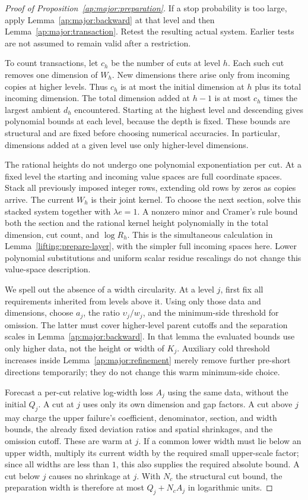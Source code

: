 \begin{proof}[Proof of Proposition~\ref{ap:major:preparation}]
If a stop probability is too large, apply
Lemma~\ref{ap:major:backward} at that level and then
Lemma~\ref{ap:major:transaction}.  Retest the resulting actual
system.  Earlier tests are not assumed to remain valid after a
restriction.

To count transactions, let $c_h$ be the number of cuts at level
$h$.  Each such cut removes one dimension of $W_h$.  New dimensions
there arise only from incoming copies at higher levels.  Thus
$c_h$ is at most the initial dimension at $h$ plus its total incoming
dimension.  The total dimension added at $h-1$ is at most $c_h$
times the largest ambient $d_h$ encountered.  Starting at the
highest level and descending gives polynomial bounds at each
level, because the depth is fixed.  These bounds are structural
and are fixed before choosing numerical accuracies.  In particular,
dimensions added at a given level use only higher-level dimensions.

The rational heights do not undergo one polynomial exponentiation
per cut.  At a fixed level the starting and incoming value spaces
are full coordinate spaces.  Stack all previously imposed integer
rows, extending old rows by zeros as copies arrive.  The current
$W_h$ is their joint kernel.  To choose the next section, solve this
stacked system together with $\lambda e=1$.  A nonzero minor and
Cramer's rule bound both the section and the rational kernel
height polynomially in the total dimension, cut count, and
$\log R_h$.  This is the simultaneous calculation in
Lemma~\ref{lifting:prepare-layer}, with the simpler full incoming
spaces here.  Lower polynomial substitutions and uniform scalar
residue rescalings do not change this value-space description.

We spell out the absence of a width circularity.  At a level $j$,
first fix all requirements inherited from levels above it.  Using
only those data and dimensions, choose $a_j$, the ratio $\upsilon_j/w_j$,
and the minimum-side threshold for omission.  The latter must
cover higher-level parent cutoffs and the separation scales in
Lemma~\ref{ap:major:backward}.  In that lemma the evaluated bounds
use only higher data, not the height or width of $K_j$.
Auxiliary cold threshold increases inside
Lemma~\ref{ap:major:refinement} merely remove further pre-short
directions temporarily; they do not change this warm minimum-side
choice.

Forecast a per-cut relative log-width loss $A_j$ using the same
data, without the initial $Q_j$.  A cut at $j$ uses only its own
dimension and gap factors.  A cut above $j$ may charge the upper
failure's coefficient, denominator, section, and width bounds,
the already fixed deviation ratios and spatial shrinkages, and
the omission cutoff.  These are warm at $j$.  If a common lower
width must lie below an upper width, multiply its current width
by the required small upper-scale factor; since all widths are
less than $1$, this also supplies the required absolute bound.
A cut below $j$ causes no shrinkage at $j$.  With $N_c$ the
structural cut bound, the preparation width is therefore at most
$Q_j+N_cA_j$ in logarithmic units.


\end{proof}
